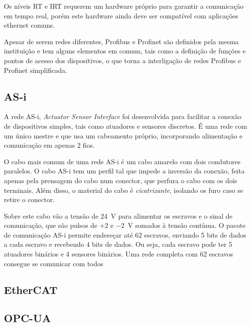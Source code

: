 Os níveis RT e IRT requerem um hardware próprio para garantir a comunicação em tempo real, porém este hardware ainda deve ser compatível com aplicações ethernet comuns.

Apesar de serem redes diferentes, Profibus e Profinet são definidos pela mesma instituição e tem alguns elementos em comum, tais como a definição de funções e pontos de acesso dos dispositivos, o que torna a interligação de redes Profibus e Profinet simplificada. 

\subsection{AS-i}

A rede AS-i, \emph{Actuator Sensor Interface} foi desenvolvida para facilitar a conexão de dispositivos simples, tais como atuadores e sensores discretos. É uma rede com um único mestre e que usa um cabeamento próprio, incorporando alimentação e comunicação em apenas 2 fios.

O cabo mais comum de uma rede AS-i é um cabo amarelo com dois condutores paralelos. O cabo AS-i tem um perfil tal que impede a inversão da conexão, feita apenas pela prensagem do cabo num conector, que perfura o cabo com os dois terminais. Além disso, o material do cabo é \emph{cicatrizante}, isolando os furo caso se retire o conector.

Sobre este cabo vão a tensão de \SI{24}{V} para alimentar os escravos e o sinal de comunicação, que são pulsos de +2 e \SI{-2}{V} somados à tensão contínua. O pacote de comunicação AS-i permite endereçar até 62 escravos, enviando 5 bits de dados a cada escravo e recebendo 4 bits de dados. Ou seja, cada escravo pode ter 5 atuadores binários e 4 sensores binários. Uma rede completa com 62 escravos consegue se comunicar com todos 

\subsection{EtherCAT}



\subsection{OPC-UA}


